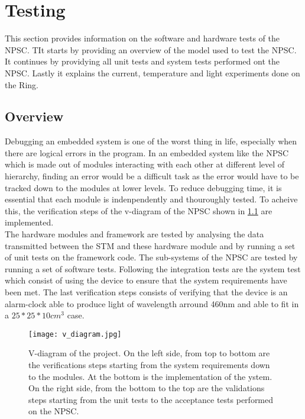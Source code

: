 \chapter{Testing}
This section provides information on the software and hardware tests of the NPSC. TIt starts by providing an overview of the model used to test the NPSC. It continues by providying all unit tests and system tests performed ont the NPSC. Lastly it explains the current, temperature and light experiments done on the Ring.
   
   
\section{Overview}
Debugging an embedded system is one of the worst thing in life, especially when there are logical errors in the program. In an embedded system like the NPSC which is made out of modules interacting with each other at different level of hierarchy, finding an error would be a difficult task as the error would have to be tracked down to the modules at lower levels. To reduce debugging time, it is essential that each module is indenpendently and thouroughly tested. To acheive this, the verification steps of the v-diagram of the NPSC shown in \cref{fig:v_diagram} are implemented.\\
The hardware modules and framework are tested by analysing the data transmitted between the STM and these hardware module and by running a set of unit tests on the framework code. The sub-systems of the NPSC are tested by running a set of software tests. Following the integration tests are the system test which consist of using the device to ensure that the system requirements have been met. The last verification steps consists of verifying that the device is an alarm-clock able to produce light of wavelength arround 460nm and able to fit in a $25*25*10 cm^3$ case. 
\begin{landscape} 
\begin{figure}[ht]
\centering
\texttt{[image: v\_diagram.jpg]}
\caption{V-diagram of the project. On the left side, from top to bottom are the verifications steps starting from the system requirements down to the modules. At the bottom is the implementation of the ystem. On the right side, from the bottom to the top are the validations steps starting from the unit tests to the acceptance tests performed on the NPSC.}
\label{fig:v_diagram}
\end{figure}
\end{landscape}
